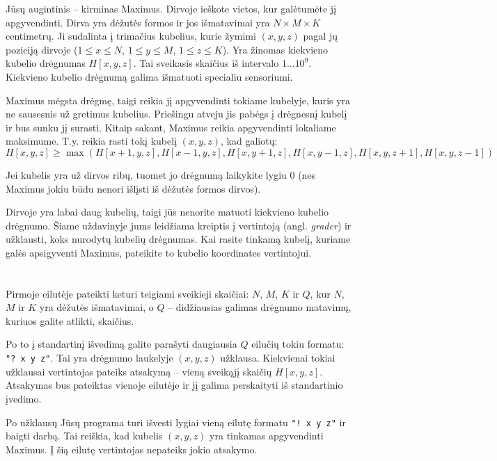\ifx\boi\undefined\fi
\def\version{jury-1}

Jūsų augintinis -- kirminas Maximus. Dirvoje ieškote vietos, kur galėtumėte jį apgyvendinti.
Dirva yra dėžutės formos ir jos išmatavimai yra $N \times M \times K$ centimetrų.
Ji sudalinta į trimačius kubelius, kurie žymimi $(x,y,z)$ pagal jų poziciją dirvoje ($1 \le x \le N$, $1 \le y \le M$, $1 \le z \le K$). 
Yra žinomas kiekvieno kubelio drėgnumas $H[x,y,z]$. Tai sveikasis skaičius iš intervalo $1 \dots 10^9$. Kiekvieno kubelio drėgnumą galima išmatuoti specialiu sensoriumi.

Maximus mėgsta drėgmę, taigi reikia jį apgyvendinti tokiame kubelyje, kuris yra ne sausesnis už gretimus kubelius. Priešingu atveju jis pabėgs į drėgnesnį kubelį ir bus sunku jį surasti.
Kitaip sakant, Maximus reikia apgyvendinti lokaliame maksimume.
T.y. reikia rasti tokį kubelį $(x,y,z)$, kad galiotų:
$$
H[x,y,z] \ge \max(H[x+1,y,z], H[x-1,y,z], H[x,y+1,z], H[x,y-1,z], H[x,y,z+1], H[x,y,z-1])
$$

Jei kubelis yra už dirvos ribų, tuomet jo drėgnumą laikykite lygiu $0$ (nes Maximus jokiu būdu nenori išlįsti iš dėžutės formos dirvos).

Dirvoje yra labai daug kubelių, taigi jūs nenorite matuoti kiekvieno kubelio drėgnumo. Šiame uždavinyje jums leidžiama kreiptis į vertintoją (angl. \emph{grader}) ir užklausti, koks nurodytų kubelių drėgnumas.
Kai rasite tinkamą kubelį, kuriame galės apsigyventi Maximus, pateikite to kubelio koordinates vertintojui.

\section*{\interactivity}
Pirmoje eilutėje pateikti keturi teigiami sveikieji skaičiai: $N$, $M$, $K$ ir $Q$, kur $N$, $M$ ir $K$ yra dėžutės išmatavimai, o $Q$ -- didžiausias galimas drėgnumo matavimų, kuriuos galite atlikti, skaičius.

Po to į standartinį išvedimą galite parašyti daugiausia $Q$ eilučių tokiu formatu: \texttt{"?\ x y z"}.
Tai yra drėgnumo laukelyje $(x, y, z)$ užklausa.
Kiekvienai tokiai užklausai vertintojas pateiks atsakymą -- vieną sveikąjį skaičių  $H[x,y,z]$. Atsakymas bus pateiktas vienoje eilutėje ir jį galima perskaityti iš standartinio įvedimo.

Po užklausų Jūsų programa turi išvesti lygiai vieną eilutę formatu \texttt{"!\ x y z"} ir baigti darbą.
Tai reiškia, kad kubelis $(x, y, z)$ yra tinkamas apgyvendinti Maximus. 
Į šią eilutę vertintojas nepateiks jokio atsakymo.

